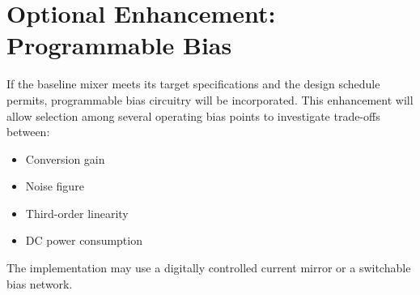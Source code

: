 
\section{Optional Enhancement: Programmable Bias}

If the baseline mixer meets its target specifications and the design schedule permits, programmable bias circuitry will be incorporated.
This enhancement will allow selection among several operating bias points to investigate trade-offs between:

\begin{itemize}
    \item Conversion gain
    \item Noise figure
    \item Third-order linearity
    \item DC power consumption
\end{itemize}

The implementation may use a digitally controlled current mirror or a switchable bias network.

